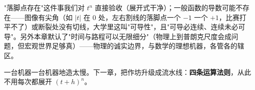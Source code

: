 \begin{chengshi}
"落脚点存在"这件事我们对 $t^n$ 直接验收（展开式干净）；一般函数的导数可能不存在——图像有尖角（如 $|t|$ 在 $0$ 处，左右割线的落脚点一个 $-1$ 一个 $+1$，比赛打平不了）或断裂处没有切线，大学里这叫"可导性"，且"可导必连续、连续未必可导"。另外本章默认了"时间与路程可以无限细分"（物理上到普朗克尺度会成问题，但宏观世界足够真）——物理的诚实边界，与数学的理想机器，各管各的辖区。
\end{chengshi}

一台机器一台机器地造太慢。下一章，把作坊升级成流水线：\textbf{四条运算法则}，从此不用每次都展开 $(t+h)^n$。
